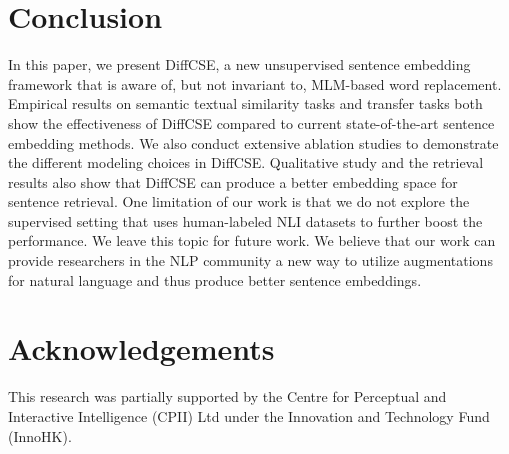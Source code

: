 \documentclass[11pt]{article}
\begin{document}
\section{Conclusion}

In this paper, we present DiffCSE, a new unsupervised sentence embedding framework that is aware of, but not invariant to, MLM-based word replacement. Empirical results on semantic textual similarity tasks and transfer tasks both show the effectiveness of DiffCSE compared to current state-of-the-art sentence embedding methods. We also conduct extensive ablation studies to demonstrate the different modeling choices in DiffCSE. Qualitative study and the retrieval results also show that DiffCSE can produce a better embedding space for sentence retrieval. 
One limitation of our work is that we do not explore the supervised setting that uses human-labeled NLI datasets to further boost the performance. We leave this topic for future work. 
We believe that our work can provide researchers in the NLP community a new way to utilize augmentations for natural language and thus produce better sentence embeddings.


\section*{Acknowledgements}
This research was partially supported by the Centre for Perceptual and Interactive Intelligence (CPII) Ltd under the Innovation and Technology Fund (InnoHK). 






\newpage
\appendix
\end{document}
